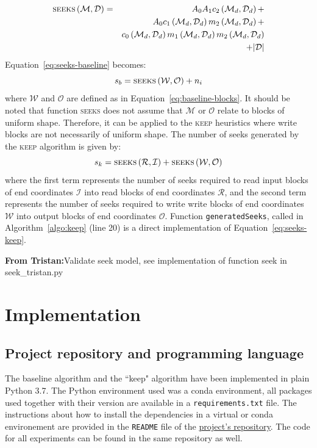 \documentclass[sigconf, nonacm]{acmart}
\newcommand{\tristan}[1]{\color{orange}\textbf{From Tristan:}#1\color{black}}
\newcommand{\keep}[0]{\textsc{keep}\xspace}
\begin{document}
\begin{eqnarray*}
  \textsc{seeks} \left(  \mathcal{M}, \mathcal{D} \right) &=&  A_0 A_1 c_2\left(\mathcal{M}_d, \mathcal{D}_d\right) + \\
                                                         &&  A_0 c_1\left(\mathcal{M}_d, \mathcal{D}_d\right) m_2\left(\mathcal{M}_d, \mathcal{D}_d\right) +\\
                                                         && c_0\left(\mathcal{M}_d, \mathcal{D}_d\right) m_1\left(\mathcal{M}_d, \mathcal{D}_d\right) m_2\left(\mathcal{M}_d, \mathcal{D}_d \right)\\
                                                         && + \vert \mathcal{D} \vert
\end{eqnarray*}
Equation~\ref{eq:seeks-baseline} becomes:
\[
  s_b = \textsc{seeks} \left( \mathcal{W}, \mathcal{O} \right) + n_i
\]
where $\mathcal{W}$ and $\mathcal{O}$ are defined as in
Equation~\ref{eq:baseline-blocks}. It should be noted that function
\textsc{seeks} does not assume that $\mathcal{M}$ or $\mathcal{O}$ relate to
blocks of uniform shape. Therefore, it can be applied to the \keep
heuristics where write blocks are not necessarily of uniform shape.
The number of seeks generated by the \keep algorithm is given by:
\begin{equation}
  s_k = \textsc{seeks} \left(  \mathcal{R}, \mathcal{I} \right) + \textsc{seeks} \left( \mathcal{W}, \mathcal{O} \right) \label{eq:seeks-keep}
\end{equation}
where the first term represents the number of seeks required to read input
 blocks of end coordinates $\mathcal{I}$ into read blocks of end
 coordinates $\mathcal{R}$, and the second term represents the number of
 seeks required to write write blocks of end coordinates $\mathcal{W}$ into
 output blocks of end coordinates $\mathcal{O}$. Function
 \texttt{generatedSeeks}, called in Algorithm~\ref{algo:keep} (line 20) is
 a direct implementation of Equation~\ref{eq:seeks-keep}.

 \tristan{Validate seek model, see implementation of function seek in seek\_tristan.py}



\section{Implementation}

\subsection{Project repository and programming language}
The baseline algorithm and the ``keep" algorithm have been implemented in plain
Python 3.7.
The Python environment used was a conda environment, all packages used together
with their version are available in a \texttt{requirements.txt} file.
The instructions about how to install the dependencies in a virtual or conda
environement are provided in the \texttt{README} file of the
\href{https://github.com/GTimothee/repartition_experiments}{project's repository}.
The code for all experiments can be found in the same repository as well.
\end{document}
